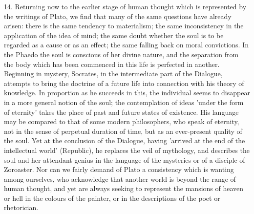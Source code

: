 14. Returning now to the earlier stage of human thought which is
represented by the writings of Plato, we find that many of the
same questions have already arisen: there is the same tendency to
materialism; the same inconsistency in the application of the idea of
mind; the same doubt whether the soul is to be regarded as a cause or as
an effect; the same falling back on moral convictions. In the Phaedo the
soul is conscious of her divine nature, and the separation from the body
which has been commenced in this life is perfected in another. Beginning
in mystery, Socrates, in the intermediate part of the Dialogue, attempts
to bring the doctrine of a future life into connection with his theory
of knowledge. In proportion as he succeeds in this, the individual seems
to disappear in a more general notion of the soul; the contemplation of
ideas 'under the form of eternity' takes the place of past and future
states of existence. His language may be compared to that of some modern
philosophers, who speak of eternity, not in the sense of perpetual
duration of time, but as an ever-present quality of the soul. Yet at
the conclusion of the Dialogue, having 'arrived at the end of the
intellectual world' (Republic), he replaces the veil of mythology,
and describes the soul and her attendant genius in the language of the
mysteries or of a disciple of Zoroaster. Nor can we fairly demand of
Plato a consistency which is wanting among ourselves, who acknowledge
that another world is beyond the range of human thought, and yet are
always seeking to represent the mansions of heaven or hell in
the colours of the painter, or in the descriptions of the poet or
rhetorician.

